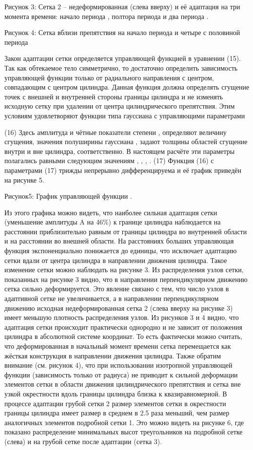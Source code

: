 Рисунок 3: Сетка 2 – недеформированная (слева вверху) и её адаптация на три момента времени: начало периода  , полтора периода   и два периода  .



Рисунок 4: 	Сетка вблизи препятствия на начало периода   и четыре с половиной периода  

Закон адаптации сетки определяется управляющей функцией   в уравнении (15). Так как обтекаемое тело симметрично, то достаточно определить зависимость управляющей функции только от радиального направления   с центром, совпадающим с центром цилиндра. Данная функция должна определять сгущение точек с внешней и внутренней стороны границы цилиндра и не изменять исходную сетку при удалении от центра цилиндрического препятствия. Этим условиям удовлетворяют функции типа гауссиана с управляющими параметрами

(16)
Здесь амплитуда   и чётные показатели степени  ,   определяют величину сгущения, значения полуширины гауссиана  ,   задают толщины областей сгущение внутри и вне цилиндра, соответственно. В настоящем расчёте эти параметры полагались равными следующим значениям
,  ,  ,  .	(17)
Функция (16) с параметрами (17) трижды непрерывно дифференцируема и её график приведён на рисунке 5.


Рисунок5: График управляющей функции  .

Из этого графика можно видеть, что наиболее сильная адаптация сетки (уменьшение амплитуды A на 46\%) к границе цилиндра наблюдается на расстоянии приблизительно равным   от границы цилиндра во внутренней области и на расстоянии   во внешней области. На расстояниях больших   управляющая функция экспоненциально понижается до единицы, что исключает адаптацию сетки вдали от центра цилиндра в направлении движения цилиндра. Такое изменение сетки можно наблюдать на рисунке 3. Из распределения узлов сетки, показанных на рисунке 3 видно, что в направлении перпендикулярном движению сетка сильно деформируется. Это явление связано с тем, что число узлов в адаптивной сетке не увеличивается, а в направлении перпендикулярном движению исходная недеформированная сетка 2 (слева вверху на рисунке 3) имеет меньшую плотность распределения узлов.
Из рисунков 3 и 4 видно, что адаптация сетки происходит практически однородно и не зависит от положения цилиндра в абсолютной системе координат. То есть фактически можно считать, что деформированная в начальный момент времени сетка перемещается как жёсткая конструкция в направлении движения цилиндра.
Также обратим внимание (см. рисунок 4), что при использовании изотропной управляющей функции (зависимость только от радиуса) не приводит к сильной деформации элементов сетки в области движения цилиндрического препятствия и сетка вне узкой окрестности вдоль границы цилиндра близка к квазиравномерной.
В процессе адаптации грубой сетки 2 размер элементов сетки в окрестности границы цилиндра имеет размер в среднем в 2.5 раза меньший, чем размер аналогичных элементов подробной сетки 1. Это можно видеть на рисунке 6, где показано распределение минимальных высот треугольников на подробной сетке (слева) и на грубой сетке после адаптации (сетка 3). 


